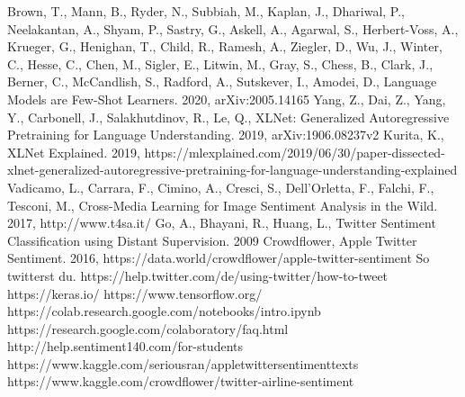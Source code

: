 \documentclass[12pt,german]{report}
\begin{document}
\begin{thebibliography}{}
 Brown, T., Mann, B., Ryder, N., Subbiah, M., Kaplan, J., Dhariwal, P., Neelakantan, A., Shyam, P., Sastry, G., Askell, A., Agarwal, S., Herbert-Voss, A., Krueger, G., Henighan, T., Child, R., Ramesh, A., Ziegler, D., Wu, J., Winter, C., Hesse, C., Chen, M., Sigler, E., Litwin, M., Gray, S., Chess, B., Clark, J., Berner, C., McCandlish, S., Radford, A., Sutskever, I., Amodei, D., Language Models are Few-Shot Learners. 2020,  arXiv:2005.14165 
 Yang, Z., Dai, Z., Yang, Y., Carbonell, J., Salakhutdinov, R., Le, Q., XLNet: Generalized Autoregressive Pretraining
for Language Understanding. 2019, arXiv:1906.08237v2
 Kurita, K., XLNet Explained. 2019,  https://mlexplained.com/2019/06/30/paper-dissected-xlnet-generalized-autoregressive-pretraining-for-language-understanding-explained
 Vadicamo, L., Carrara, F., Cimino, A., Cresci, S., Dell'Orletta, F., Falchi, F., Tesconi, M., Cross-Media Learning for Image Sentiment Analysis in the Wild. 2017, http://www.t4sa.it/
 Go, A., Bhayani, R., Huang, L., Twitter Sentiment Classification using Distant Supervision. 2009
 Crowdflower, Apple Twitter Sentiment. 2016, https://data.world/crowdflower/apple-twitter-sentiment
 So twitterst du. https://help.twitter.com/de/using-twitter/how-to-tweet
 https://keras.io/
 https://www.tensorflow.org/
 https://colab.research.google.com/notebooks/intro.ipynb
 https://research.google.com/colaboratory/faq.html
 http://help.sentiment140.com/for-students
 https://www.kaggle.com/seriousran/appletwittersentimenttexts
 https://www.kaggle.com/crowdflower/twitter-airline-sentiment
\end{thebibliography}
\end{document}
